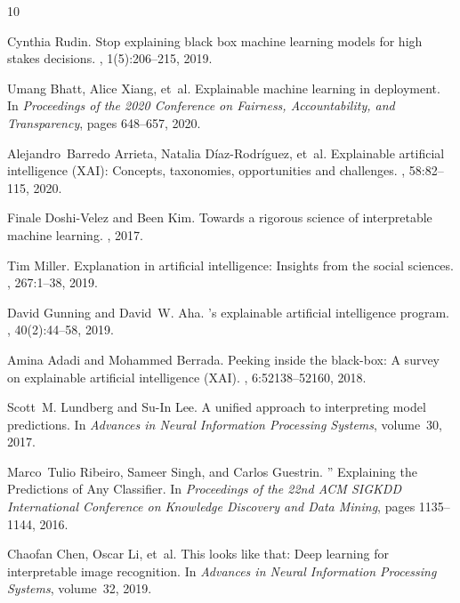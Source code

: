 \documentclass[11pt,letter,leqno]{article}
\begin{document}
\begin{thebibliography}{10}

Cynthia Rudin.
\newblock Stop explaining black box machine learning models for high stakes
  decisions.
, 1(5):206--215, 2019.

Umang Bhatt, Alice Xiang, et~al.
\newblock Explainable machine learning in deployment.
\newblock In {\em Proceedings of the 2020 Conference on Fairness,
  Accountability, and Transparency}, pages 648--657, 2020.

Alejandro~Barredo Arrieta, Natalia D{\'i}az-Rodr{\'i}guez, et~al.
\newblock Explainable artificial intelligence ({XAI}): Concepts, taxonomies,
  opportunities and challenges.
, 58:82--115, 2020.

Finale Doshi-Velez and Been Kim.
\newblock Towards a rigorous science of interpretable machine learning.
, 2017.

Tim Miller.
\newblock Explanation in artificial intelligence: Insights from the social
  sciences.
, 267:1--38, 2019.

David Gunning and David~W. Aha.
's explainable artificial intelligence program.
, 40(2):44--58, 2019.

Amina Adadi and Mohammed Berrada.
\newblock Peeking inside the black-box: A survey on explainable artificial
  intelligence ({XAI}).
, 6:52138--52160, 2018.

Scott~M. Lundberg and Su-In Lee.
\newblock A unified approach to interpreting model predictions.
\newblock In {\em Advances in Neural Information Processing Systems},
  volume~30, 2017.

Marco~Tulio Ribeiro, Sameer Singh, and Carlos Guestrin.
'' {Explaining the Predictions of Any
  Classifier}.
\newblock In {\em Proceedings of the 22nd ACM SIGKDD International Conference
  on Knowledge Discovery and Data Mining}, pages 1135--1144, 2016.

Chaofan Chen, Oscar Li, et~al.
\newblock This looks like that: Deep learning for interpretable image
  recognition.
\newblock In {\em Advances in Neural Information Processing Systems},
  volume~32, 2019.


\end{thebibliography}
\end{document}

